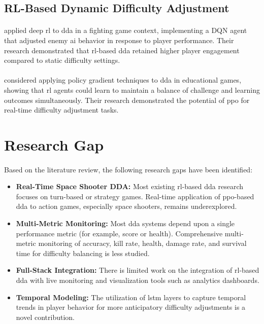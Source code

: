 \subsection{RL-Based Dynamic Difficulty Adjustment}
\paragraph{} \citet{zhao2020deep} applied deep \ac{rl} to \ac{dda} in a fighting game context, implementing a DQN agent that adjusted enemy \ac{ai} behavior in response to player performance. Their research demonstrated that \ac{rl}-based \ac{dda} retained higher player engagement compared to static difficulty settings.

\paragraph{} \citet{silva2021dynamic} considered applying policy gradient techniques to \ac{dda} in educational games, showing that \ac{rl} agents could learn to maintain a balance of challenge and learning outcomes simultaneously. Their research demonstrated the potential of \ac{ppo} for real-time difficulty adjustment tasks.

\section{Research Gap}
\paragraph{} Based on the literature review, the following research gaps have been identified:

\begin{itemize}
	\item \textbf{Real-Time Space Shooter DDA:} Most existing \ac{rl}-based \ac{dda} research focuses on turn-based or strategy games. Real-time application of \ac{ppo}-based \ac{dda} to action games, especially space shooters, remains underexplored.
	\item \textbf{Multi-Metric Monitoring:} Most \ac{dda} systems depend upon a single performance metric (for example, score or health). Comprehensive multi-metric monitoring of accuracy, kill rate, health, damage rate, and survival time for difficulty balancing is less studied.
	\item \textbf{Full-Stack Integration:} There is limited work on the integration of \ac{rl}-based \ac{dda} with live monitoring and visualization tools such as analytics dashboards.
	\item \textbf{Temporal Modeling:} The utilization of \ac{lstm} layers to capture temporal trends in player behavior for more anticipatory difficulty adjustments is a novel contribution.
\end{itemize}

